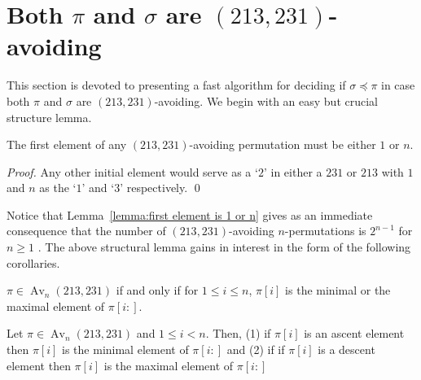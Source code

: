 \documentclass[a4paper]{llncs}
\DeclareMathOperator{\AV}{Av}
\DeclareMathOperator{\Avd}{Av}
\newcommand\Av[2]{\Avd_{{#1}}({#2})}
\DeclareMathOperator{\stripea}{s}
\newcommand{\stripe}[2]{\stripea_{{#1}}[{#2}]}
\newcounter{num}
\newcommand{\dstep}{d}
\newcommand{\ustep}{a}
\begin{document}


\section{Both $\pi$ and $\sigma$ are $(213,231)$-avoiding}
\label{section:both are (231,213)-avoiding}

This section is devoted to presenting a fast algorithm for deciding if
$\sigma \preceq \pi$
in case both $\pi$ and $\sigma$ are $(213,231)$-avoiding.
We begin with an easy but crucial structure lemma.

\begin{lemma}[Folklore]
\label{lemma:first element is 1 or n}
The first element of any $(213,231)$-avoiding permutation
must be either $1$ or $n$.
\end{lemma}

\begin{proof}
Any other initial element would serve as a `$2$' in either a
$231$ or $213$ with $1$ and $n$ as the `$1$' and `$3$' respectively.
\qed
\end{proof}

Notice that Lemma~\ref{lemma:first element is 1 or n} gives as an
immediate consequence that the number of $(213,231)$-avoiding $n$-permutations
is $2^{n-1}$ for $n\geq 1$ \cite{Simion:Schmidt:EJC:1985}.
The above structural lemma gains in interest in the form of the following corollaries.

\begin{corollary}
\label{corollary:minmaxelement}
$\pi \in \AV_n(213,231)$ if and only if for $1 \leq i \leq n$,
$\pi[i]$ is the minimal or the maximal element of $\pi[i:]$.
\end{corollary}

\begin{corollary}
\label{corollary:max is ascent}
Let $\pi \in \AV_n(213,231)$ and $1 \leq i < n$. Then,
(1) 
if $\pi[i]$ is an ascent element then $\pi[i]$ is the minimal element 
of $\pi[i:]$
and 
(2)
if if $\pi[i]$ is a descent element then $\pi[i]$ is the maximal element 
of $\pi[i:]$
\end{corollary}

%
\end{document}
